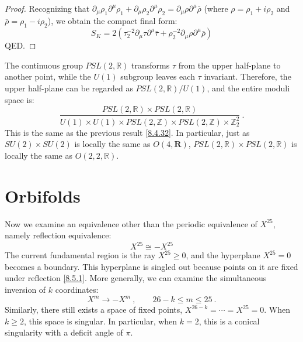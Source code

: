 \begin{tcolorbox}[breakable]
\begin{proof}
		Recognizing that \(\partial_\mu \rho_1 \partial^\mu \rho_1 + \partial_\mu \rho_2 \partial^\mu \rho_2 = \partial_\mu \rho \partial^\mu \bar{\rho}\) (where \(\rho = \rho_1 + i\rho_2\) and \(\bar{\rho} = \rho_1 - i\rho_2\)), we obtain the compact final form:
		\begin{equation}
			S_K = 2 \left( \tau_2^{-2} \partial_\mu \tau \partial^\mu \bar{\tau} + \rho_2^{-2} \partial_\mu \rho \partial^\mu \bar{\rho} \right)
		\end{equation}
		QED.
	\end{proof}
\end{tcolorbox}
The continuous group $P S L(2, \mathds{R})$ transforms $\tau$ from the upper half-plane to another point, 
while the $U(1)$ subgroup leaves each $\tau$ invariant. 
Therefore, the upper half-plane can be regarded as $P S L(2, \mathds{R}) / U(1)$, and the entire moduli space is:
\begin{equation}
	\frac{P S L(2, \mathds{R}) \times P S L(2, \mathds{R})}{U(1) \times U(1) \times P S L(2, \mathds{Z}) \times P S L(2, \mathds{Z}) \times \mathds{Z}_{2}^{2}} \:. \label{8.4.41}
\end{equation}
This is the same as the previous result \eqref{8.4.32}. In particular, just as $S U(2) \times S U(2)$ is locally the same as $O(4, \mathbf{R})$, $P S L(2, \mathds{R}) \times P S L(2, \mathds{R})$ is locally the same as $O(2, 2, \mathds{R})$.

\section{\texorpdfstring{Orbifolds}{8.5 Orbifolds}} \label{sec:8.5}

Now we examine an equivalence other than the periodic equivalence of $X^{25}$, namely reflection equivalence:
\begin{equation}
	X^{25} \cong-X^{25} \label{8.5.1}
\end{equation}
The current fundamental region is the ray $X^{25} \geq 0$, and the hyperplane $X^{25}=0$ becomes a boundary. This hyperplane is singled out because points on it are fixed under reflection \eqref{8.5.1}. 
More generally, we can examine the simultaneous inversion of $k$ coordinates:
\begin{equation}
	X^{m} \rightarrow-X^{m}\:, \qquad 26-k \leq m \leq 25 \:. \label{8.5.2}
\end{equation}
Similarly, there still exists a space of fixed points, $X^{26-k}=\cdots=X^{25}=0$. When $k \geq 2$, this space is singular. 
In particular, when $k=2$, this is a conical singularity with a deficit angle of $\pi$.

